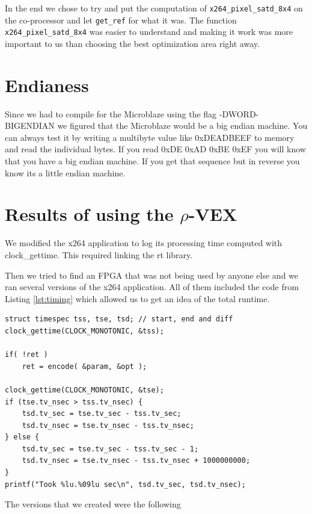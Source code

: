 \documentclass{article}
\newcommand{\rvex}{\ensuremath{\rho}-VEX}
\newcommand{\satd}{\texttt{x264\_pixel\_satd\_8x4}}
\newcommand{\getref}{\texttt{get\_ref}}
\begin{document}
In the end we chose to try and put the computation of \satd{} on the
co-processor and let \getref{} for what it was. 
The function \satd{} was easier
to understand and making it work was more important to us than choosing the
best optimization area right away.

\section{Endianess}

Since we had to compile for the Microblaze using the flag -DWORD-BIGENDIAN we
figured that the Microblaze would be a big endian machine. 
You can always test
it by writing a multibyte value like 0xDEADBEEF to memory and read the
individual bytes. 
If you read 0xDE 0xAD 0xBE 0xEF you will know that you have a
big endian machine. 
If you get that sequence but in reverse you know its a
little endian machine.

\section{Results of using the \rvex{}}

We modified the x264 application to log its processing time computed with
clock\_gettime. 
This required linking the rt library.

Then we tried to find an FPGA that was not being used by anyone else and we ran
several versions of the x264 application. 
All of them included the code from Listing \ref{lst:timing} which allowed us to get an idea of the total runtime. 

\begin{lstlisting}[style=C,caption=Capturing runtime with the monotonic clock,label=lst:timing]
struct timespec tss, tse, tsd; // start, end and diff
clock_gettime(CLOCK_MONOTONIC, &tss);

if( !ret )
    ret = encode( &param, &opt );

clock_gettime(CLOCK_MONOTONIC, &tse);
if (tse.tv_nsec > tss.tv_nsec) {
    tsd.tv_sec = tse.tv_sec - tss.tv_sec;
    tsd.tv_nsec = tse.tv_nsec - tss.tv_nsec;
} else {
    tsd.tv_sec = tse.tv_sec - tss.tv_sec - 1;
    tsd.tv_nsec = tse.tv_nsec - tss.tv_nsec + 1000000000;
}
printf("Took %lu.%09lu sec\n", tsd.tv_sec, tsd.tv_nsec);
\end{lstlisting}

The versions that we created were the following
\end{document}
